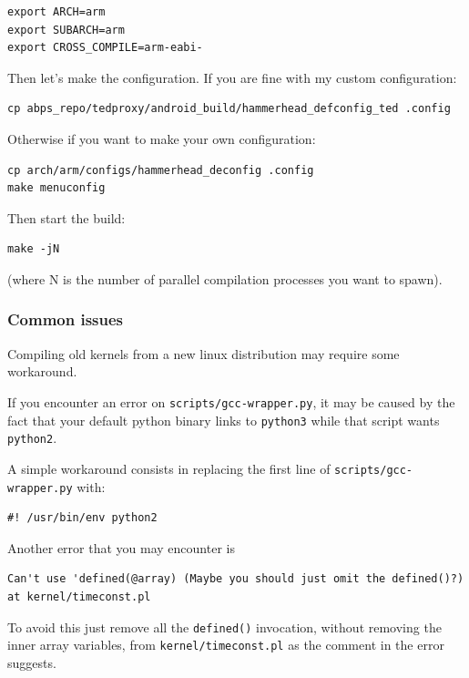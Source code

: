 \documentclass[a4paper]{article}
\begin{document}
\begin{lstlisting}
export ARCH=arm
export SUBARCH=arm
export CROSS_COMPILE=arm-eabi-
\end{lstlisting}
Then let's make the configuration. If you are fine with my custom configuration:

\begin{lstlisting}
cp abps_repo/tedproxy/android_build/hammerhead_defconfig_ted .config
\end{lstlisting}

Otherwise if you want to make your own configuration:

\begin{lstlisting}
cp arch/arm/configs/hammerhead_deconfig .config
make menuconfig
\end{lstlisting}

Then start the build:

\begin{lstlisting}
make -jN
\end{lstlisting}

(where N is the number of parallel compilation processes you want to spawn).


\subsubsection{Common issues}

Compiling old kernels from a new linux distribution may require some workaround.

If you encounter an error on \texttt{scripts/gcc-wrapper.py}, it may be caused by the fact that
your default python binary links to \texttt{python3} while that script wants
\texttt{python2}.

A simple workaround consists in replacing the first line of
\texttt{scripts/gcc-wrapper.py} with:

\begin{lstlisting}
#! /usr/bin/env python2
\end{lstlisting}

Another error that you may encounter is 

\begin{lstlisting}
Can't use 'defined(@array) (Maybe you should just omit the defined()?) at kernel/timeconst.pl
\end{lstlisting}

To avoid this just remove all the \texttt{defined()} invocation, without removing the inner array variables, 
from \texttt{kernel/timeconst.pl} as the comment in the error suggests.
\end{document}
